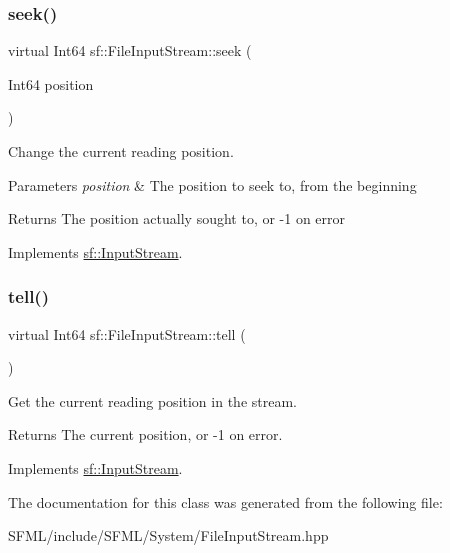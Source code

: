 \subsubsection{\texorpdfstring{seek()}{seek()}}
{\footnotesize\ttfamily virtual Int64 sf\+::\+File\+Input\+Stream\+::seek (\begin{DoxyParamCaption}\item[{Int64}]{position }\end{DoxyParamCaption})\hspace{0.3cm}{\ttfamily [virtual]}}



Change the current reading position. 


\begin{DoxyParams}{Parameters}
{\em position} & The position to seek to, from the beginning\\
\hline
\end{DoxyParams}
\begin{DoxyReturn}{Returns}
The position actually sought to, or -\/1 on error \begin{DoxyVerb}\end{DoxyVerb}
 
\end{DoxyReturn}


Implements \mbox{\hyperlink{classsf_1_1_input_stream_a76aba8e5d5cf9b1c5902d5e04f7864fc}{sf\+::\+Input\+Stream}}.

\mbox{\label{classsf_1_1_file_input_stream_a768c5fdb3be79e2d71d1bce911f8741c}} 
\subsubsection{\texorpdfstring{tell()}{tell()}}
{\footnotesize\ttfamily virtual Int64 sf\+::\+File\+Input\+Stream\+::tell (\begin{DoxyParamCaption}{ }\end{DoxyParamCaption})\hspace{0.3cm}{\ttfamily [virtual]}}



Get the current reading position in the stream. 

\begin{DoxyReturn}{Returns}
The current position, or -\/1 on error. \begin{DoxyVerb}\end{DoxyVerb}
 
\end{DoxyReturn}


Implements \mbox{\hyperlink{classsf_1_1_input_stream_a599515b9ccdbddb6fef5a98424fd559c}{sf\+::\+Input\+Stream}}.



The documentation for this class was generated from the following file\+:\begin{DoxyCompactItemize}
\item 
S\+F\+M\+L/include/\+S\+F\+M\+L/\+System/File\+Input\+Stream.\+hpp\end{DoxyCompactItemize}
